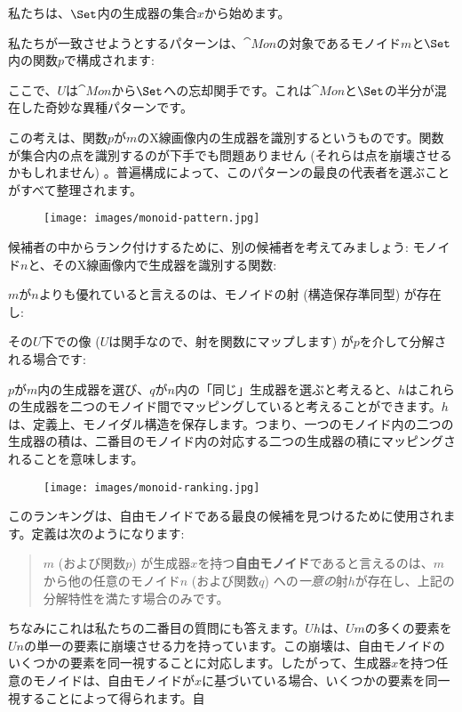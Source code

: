 私たちは、$\Set$内の生成器の集合$x$から始めます。

私たちが一致させようとするパターンは、$\cat{Mon}$の対象であるモノイド$m$と$\Set$内の関数$p$で構成されます: 

ここで、$U$は$\cat{Mon}$から$\Set$への忘却関手です。これは$\cat{Mon}$と$\Set$の半分が混在した奇妙な異種パターンです。

この考えは、関数$p$が$m$のX線画像内の生成器を識別するというものです。関数が集合内の点を識別するのが下手でも問題ありません (それらは点を崩壊させるかもしれません) 。普遍構成によって、このパターンの最良の代表者を選ぶことがすべて整理されます。

\begin{figure}[H]
  \centering
  \texttt{[image: images/monoid-pattern.jpg]}
\end{figure}

\noindent
候補者の中からランク付けするために、別の候補者を考えてみましょう: モノイド$n$と、そのX線画像内で生成器を識別する関数: 

$m$が$n$よりも優れていると言えるのは、モノイドの射 (構造保存準同型) が存在し: 

その$U$下での像 ($U$は関手なので、射を関数にマップします) が$p$を介して分解される場合です: 

$p$が$m$内の生成器を選び、$q$が$n$内の「同じ」生成器を選ぶと考えると、$h$はこれらの生成器を二つのモノイド間でマッピングしていると考えることができます。$h$は、定義上、モノイダル構造を保存します。つまり、一つのモノイド内の二つの生成器の積は、二番目のモノイド内の対応する二つの生成器の積にマッピングされることを意味します。

\begin{figure}[H]
  \centering
  \texttt{[image: images/monoid-ranking.jpg]}
\end{figure}

\noindent
このランキングは、自由モノイドである最良の候補を見つけるために使用されます。定義は次のようになります: 

\begin{quote}
  $m$ (および関数$p$) が生成器$x$を持つ\textbf{自由モノイド}であると言えるのは、$m$から他の任意のモノイド$n$ (および関数$q$) への\emph{一意の}射$h$が存在し、上記の分解特性を満たす場合のみです。
\end{quote}
ちなみにこれは私たちの二番目の質問にも答えます。$U h$は、$U m$の多くの要素を$U n$の単一の要素に崩壊させる力を持っています。この崩壊は、自由モノイドのいくつかの要素を同一視することに対応します。したがって、生成器$x$を持つ任意のモノイドは、自由モノイドが$x$に基づいている場合、いくつかの要素を同一視することによって得られます。自

